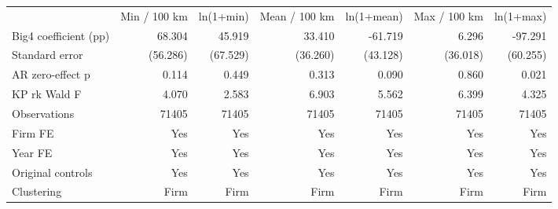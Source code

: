 \begin{tabular}{lrrrrrr}
\hline
 & Min / 100 km & ln(1+min) & Mean / 100 km & ln(1+mean) & Max / 100 km & ln(1+max) \\
Big4 coefficient (pp) & 68.304 & 45.919 & 33.410 & -61.719 & 6.296 & -97.291 \\
Standard error & (56.286) & (67.529) & (36.260) & (43.128) & (36.018) & (60.255) \\
AR zero-effect p & 0.114 & 0.449 & 0.313 & 0.090 & 0.860 & 0.021 \\
KP rk Wald F & 4.070 & 2.583 & 6.903 & 5.562 & 6.399 & 4.325 \\
Observations & 71405 & 71405 & 71405 & 71405 & 71405 & 71405 \\
Firm FE & Yes & Yes & Yes & Yes & Yes & Yes \\
Year FE & Yes & Yes & Yes & Yes & Yes & Yes \\
Original controls & Yes & Yes & Yes & Yes & Yes & Yes \\
Clustering & Firm & Firm & Firm & Firm & Firm & Firm \\
\hline
\end{tabular}
